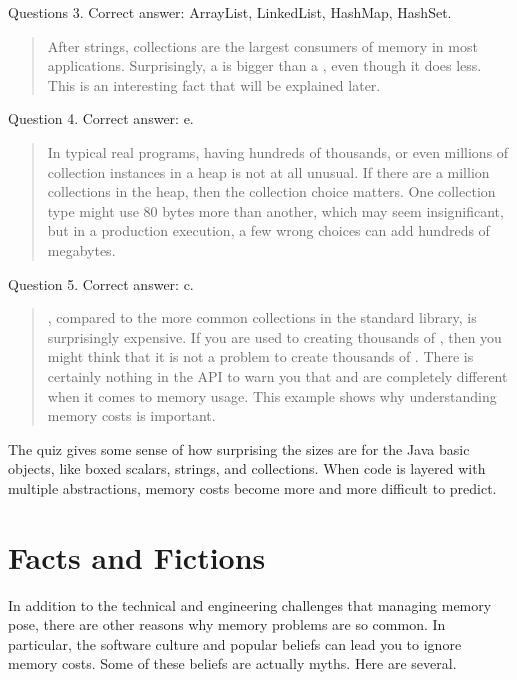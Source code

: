 Questions 3.  Correct answer: ArrayList, LinkedList, HashMap, HashSet.

\begin{quote}
After strings,
collections are the largest consumers of memory in most applications. Surprisingly, a
 is bigger than a , even though it does less.
This is an interesting fact that will be explained later.
\end{quote}

Question 4.  Correct answer: e.

\begin{quote}
In typical real programs, having hundreds of thousands, or even millions of collection
instances in a heap is not at all unusual. If there are a million collections in
the heap, then the collection choice matters. One collection type might use 80
bytes more than another, which may seem insignificant, but in a production
execution, a few wrong choices can add hundreds of megabytes.
\end{quote}

Question 5.  Correct answer: c.
\begin{quote}
, compared to the more common
collections in the standard library, is surprisingly expensive. If you are used to creating
thousands of , then you might think that it is not a problem to
create thousands of . There is certainly nothing in
the API to warn you that  and  are
completely different when it comes to memory usage. This example shows why
understanding memory costs is important.
\end{quote}

The quiz gives some sense of how surprising the sizes are for the Java basic
objects, like boxed scalars, strings, and collections. When code is layered
with multiple abstractions, memory costs become more and more difficult to
predict.

\section{Facts and Fictions}

In addition to the technical and engineering challenges that managing memory
pose, there are other reasons why memory problems are so common. In particular,
the software culture and popular beliefs can lead you to ignore memory costs. 
Some of these beliefs are actually myths.  Here are several.

